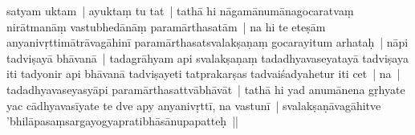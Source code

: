 \documentclass[article,12pt,a4paper]{memoir}%
\newcounter{parCount}
\begin{document}
	  \pstart \leavevmode%
	\label{thakur75-10.21}satyam uktam | ayuktaṃ tu tat | tathā hi nāgamānumānagocaratvaṃ nirātmanāṃ vastubhedānāṃ paramārthasatām | na hi te eteṣām anyanivṛttimātrāvagāhinī paramārthasatsvalakṣaṇaṃ gocarayitum arhataḥ | nāpi tadviṣayā bhāvanā | tadagrāhyam api svalakṣaṇaṃ tadadhyavaseyatayā tadviṣaya iti tadyonir api bhāvanā tadviṣayeti tatprakarṣas tadvaiśadyahetur iti cet | na | tadadhyavaseyasyāpi paramārthasattvābhāvāt | tathā hi yad anumānena gṛhyate yac cādhyavasīyate te dve apy anyanivṛttī, na vastunī | svalakṣaṇāvagāhitve 'bhilāpasaṃsargayogyapratibhāsānupapatteḥ ||
	{}
	\pend%
      
\end{document}
